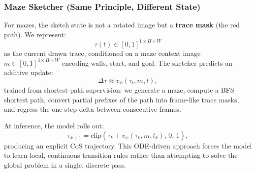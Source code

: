 \documentclass{article}
\begin{document}
\subsubsection{Maze Sketcher (Same Principle, Different State)}
For mazes, the sketch state is not a rotated image but a \textbf{trace mask} (the red path). We represent:
\begin{equation}
    \tau(t) \in [0,1]^{1 \times H \times W}
\end{equation}
as the current drawn trace, conditioned on a maze context image $m \in [0,1]^{3 \times H \times W}$ encoding walls, start, and goal. The sketcher predicts an additive update:
\begin{equation}
    \Delta\tau \approx v_\psi(\tau_t, m, t),
\end{equation}
trained from shortest-path supervision: we generate a maze, compute a BFS shortest path, convert partial prefixes of the path into frame-like trace masks, and regress the one-step delta between consecutive frames.

At inference, the model rolls out:
\begin{equation}
    \tau_{k+1} = \mathrm{clip}\!\left(\tau_k + v_\psi(\tau_k, m, t_k),\, 0,\, 1\right),
\end{equation}
producing an explicit CoS trajectory. This ODE-driven approach forces the model to learn local, continuous transition rules rather than attempting to solve the global problem in a single, discrete pass.

\newpage

\end{document}
